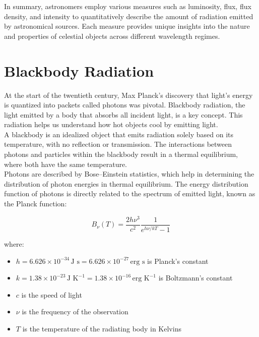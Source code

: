 In summary, astronomers employ various measures such as luminosity, flux, flux density, and intensity to quantitatively describe the amount of radiation emitted by astronomical sources. Each measure provides unique insights into the nature and properties of celestial objects across different wavelength regimes.

\section{Blackbody Radiation}

At the start of the twentieth century, Max Planck's discovery that light's energy is quantized into packets called photons was pivotal. Blackbody radiation, the light emitted by a body that absorbs all incident light, is a key concept. This radiation helps us understand how hot objects cool by emitting light. \\

A blackbody is an idealized object that emits radiation solely based on its temperature, with no reflection or transmission. The interactions between photons and particles within the blackbody result in a thermal equilibrium, where both have the same temperature. \\

Photons are described by Bose–Einstein statistics, which help in determining the distribution of photon energies in thermal equilibrium. The energy distribution function of photons is directly related to the spectrum of emitted light, known as the Planck function:

\begin{equation}
	B_\nu (T) = \frac{2h\nu^3}{c^2} \frac{1}{e^{h\nu/kT} - 1}
	\label{eq:planckfunctionfrequency}
\end{equation}


where:
\begin{itemize}
    \item \(h = 6.626 \times 10^{-34} \, \text{J s} = 6.626 \times 10^{-27} \, \text{erg s}\) is Planck’s constant
    \item \(k = 1.38 \times 10^{-23} \, \text{J K}^{-1} = 1.38 \times 10^{-16} \, \text{erg K}^{-1}\) is Boltzmann’s constant
    \item \(c\) is the speed of light
    \item \(\nu\) is the frequency of the observation
    \item \(T\) is the temperature of the radiating body in Kelvins
\end{itemize}

